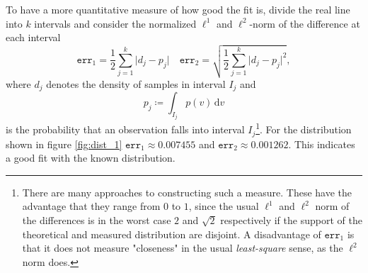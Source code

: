 %

To have a more quantitative measure of how good the fit is, divide the real line into $k$ intervals and consider the normalized $\ell^1$ and $\ell^2$-norm of the difference at each interval 
\begin{equation}\label{eq:err}
	\texttt{err}_{1}= \frac{1}{2} \sum_{j=1}^{k} \rvert d_j - p_j\lvert \quad 	\texttt{err}_{2}=  \sqrt{ \frac{1}{2} \sum_{j=1}^{k} \rvert d_j - p_j\lvert^2},
\end{equation}
where $d_j$ denotes the density of samples in interval $I_j$ and 
\[
	p_j \coloneqq \int_{I_j} p(v) \, \text{d}v
\]
is the probability that an observation falls into interval $I_j$\footnote{There are many approaches to constructing such a measure. These have the advantage that they range from $0$ to $1$, since the usual $\ell^1$ and $\ell^2$ norm of the differences is in the worst case $2$ and $\sqrt{2}$ respectively if the support of the theoretical and measured distribution are disjoint. A disadvantage of $\texttt{err}_1$ is that it does not measure "closeness" in the usual \textit{least-square} sense, as the $\ell^2$ norm does.}. For the distribution shown in figure \ref{fig:dist_1} $\texttt{err}_1 \approx  0.007455$ and $\texttt{err}_2 \approx 0.001262$. This indicates a good fit with the known distribution.

%
%
%
%
%
